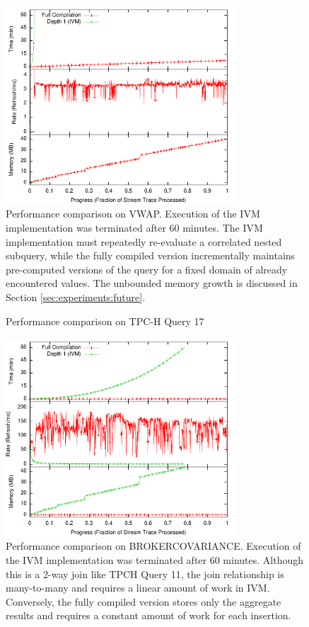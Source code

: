 \begin{figure}
\begin{center}
\includegraphics[width=3.4in]{../graphs/graphs/unified_vwap.pdf}
\caption{Performance comparison on VWAP.  Execution of the IVM implementation was terminated after 60 minutes.  The IVM implementation must repeatedly re-evaluate a correlated nested subquery, while the fully compiled version incrementally maintains pre-computed versions of the query for a fixed domain of already encountered values.  The unbounded memory growth is discussed in Section \ref{sec:experiments:future}.}
\label{fig:experiments:vwap}
\end{center}
\end{figure}

\begin{figure}
\begin{center}
\caption{Performance comparison on TPC-H Query 17}
\label{fig:experiments:tpch17}
\end{center}
\end{figure}

\begin{figure}
\begin{center}
\includegraphics[width=3.4in]{../graphs/graphs/unified_brokervariance.pdf}
\caption{Performance comparison on BROKERCOVARIANCE.  Execution of the IVM implementation was terminated after 60 minutes.  Although this is a 2-way join like TPCH Query 11, the join relationship is many-to-many and requires a linear amount of work in IVM.  Conversely, the fully compiled version stores only the aggregate results and requires a constant amount of work for each insertion.}
\label{fig:experiments:brokervariance}
\end{center}
\end{figure}

